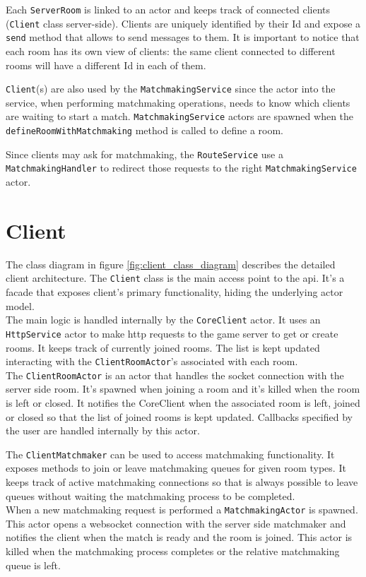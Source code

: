 Each \texttt{ServerRoom} is linked to an actor and keeps track of connected clients (\texttt{Client} class server-side). Clients are uniquely identified by their Id and expose a \texttt{send} method that allows to send messages to them. It is important to notice that each room has its own view of clients: the same client connected to different rooms will have a different Id in each of them. 

\texttt{Client}(s) are also used by the \texttt{MatchmakingService} since the actor into the service, when performing matchmaking operations, needs to know which clients are waiting to start a match. \texttt{MatchmakingService} actors are spawned when the \texttt{defineRoomWithMatchmaking} method is called to define a room.

Since clients may ask for matchmaking, the \texttt{RouteService} use a \texttt{MatchmakingHandler} to redirect those requests to the right \texttt{MatchmakingService} actor.


\section{Client}

The class diagram in figure \ref{fig:client_class_diagram} describes the detailed client architecture.
The \texttt{Client} class is the main access point to the api. It's a facade that exposes client's primary functionality, hiding the underlying actor model.  
\\
The main logic is handled internally by the \texttt{CoreClient} actor. It uses an \texttt{HttpService} actor to make http requests to the game server to get or create rooms. 
It keeps track of currently joined rooms. The list is kept updated interacting with the \texttt{ClientRoomActor}'s associated with each room.
\\
The \texttt{ClientRoomActor} is an actor that handles the socket connection with the server side room. 
It's spawned when joining a room and it's killed when the room is left or closed.  It notifies the CoreClient when the associated room is left, joined or closed so that the list of joined rooms is kept updated. 
Callbacks specified by the user are handled internally by this actor.

The \texttt{ClientMatchmaker} can be used to access matchmaking functionality. It exposes methods to join or leave matchmaking queues for given room types. It keeps track of active matchmaking connections so that is always possible to leave queues without waiting the matchmaking process to be completed.
\\
When a new matchmaking request is performed a \texttt{MatchmakingActor} is spawned. 
This actor opens a websocket connection with the server side matchmaker and notifies the client when the match is ready and the room is joined. This actor is killed when the matchmaking process completes or the relative matchmaking queue is left.

